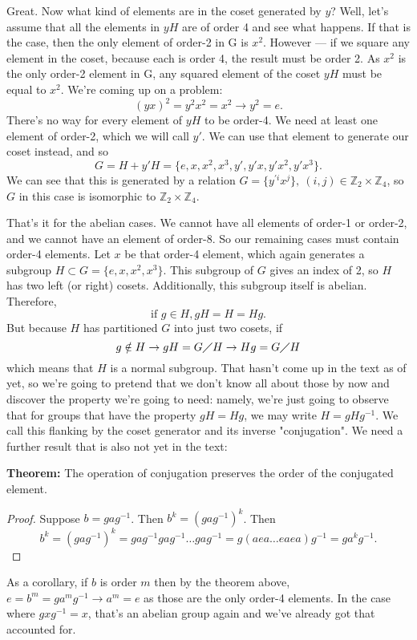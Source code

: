 \documentclass[12pt]{article}
\begin{document}
Great. Now what kind of elements are in the coset generated by $y$? Well, let's
assume that all the elements in $yH$ are of order 4 and see what happens. If
that is the case, then the only element of order-2 in G is $x^2$. However ---
if we square any element in the coset, because each is order 4, the result must
be order 2. As $x^2$ is the only order-2 element in G, any squared element of
the coset $yH$ must be equal to $x^2$. We're coming up on a problem:
\[
    (yx)^2 = y^2x^2 = x^2 \rightarrow y^2 = e.
\]
There's no way for every element of $yH$ to be order-4. We need at least one
element of order-2, which we will call $y'$. We can use that element to
generate our coset instead, and so
\[
    G = H + y'H= \{ e, x, x^2, x^3, y', y'x, y'x^2, y'x^3\}.
\]
We can see that this is generated by a relation
$G =\{y^{\prime i}x^j\},\ (i,j) \in \mathbb{Z}_2 \times \mathbb{Z}_4$,
so $G$ in this case is isomorphic to $\mathbb{Z}_2 \times \mathbb{Z}_4$.

That's it for the abelian cases. We cannot have all elements of order-1 or
order-2, and we cannot have an element of order-8. So our remaining cases must
contain order-4 elements. Let $x$ be that order-4 element, which again
generates a subgroup $H \subset G = \{ e, x, x^2, x^3 \}$. This subgroup of $G$
gives an index of 2, so $H$ has two left (or right) cosets. Additionally, this
subgroup itself is abelian. Therefore,
\[
\text{if } g \in H, gH = H = Hg.
\]
But because $H$ has partitioned $G$ into just two cosets, if
\[
    g \notin H \rightarrow gH = G \diagup H \rightarrow Hg = G \diagup H
\]
which means that $H$ is a normal subgroup. That hasn't come up in the text as
of yet, so we're going to pretend that we don't know all about those by now
and discover the property we're going to need: namely, we're just going to
observe that for groups that have the property $gH = Hg$, we may write
$H = gHg^{-1}$. We call this flanking by the coset generator and its inverse
"conjugation". We need a further result that is also not yet in the text:

\textbf{Theorem:} The operation of conjugation preserves the order of the
conjugated element.

\begin{proof}
Suppose $b = gag^{-1}$. Then $b^k = (gag^{-1})^k$. Then
\[
    b^k = (gag^{-1})^k = gag^{-1}gag^{-1}\ldots gag^{-1} 
    = g(aea \ldots eaea)g^{-1} = ga^kg^{-1}.
\]
\end{proof}
As a corollary, if $b$ is order $m$ then by the theorem above,
$e = b^m = ga^mg^{-1} \rightarrow a^m = e$ as those are the only order-4
elements. In the case where $gxg^{-1} = x$, that's an abelian group again and
we've already got that accounted for.
\end{document}
